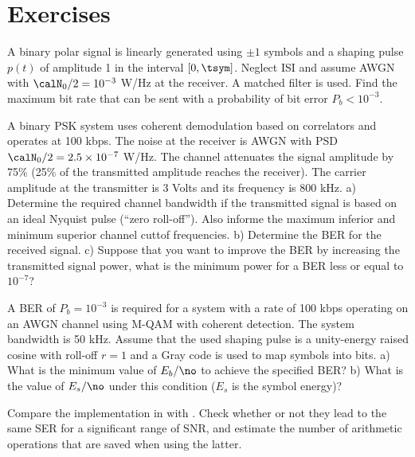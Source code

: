 \section{Exercises}

\begin{exercises}

\item A binary polar signal is linearly generated using $\pm 1$ symbols and a shaping pulse $p(t)$ of amplitude 1 in the interval $[0, \tsym]$. Neglect ISI and assume AWGN with $\calN_0 / 2 = 10^{-3}$ W/Hz at the receiver.  A matched filter is used. Find the maximum bit rate that can be sent with a probability of bit error $P_b < 10^{-3}$.

\item A binary PSK system uses coherent demodulation based on correlators and operates at 100 kbps. The noise at the receiver is AWGN with PSD $\calN_0 / 2=2.5 \times 10^{-7}$ W/Hz. The channel attenuates the signal amplitude by 75\% (25\% of the transmitted amplitude reaches the receiver). 
The carrier amplitude at the transmitter is 3 Volts and its frequency is 800 kHz. a) Determine the required channel bandwidth if the transmitted signal is based on an ideal Nyquist pulse (``zero roll-off''). Also informe the maximum inferior and minimum superior channel cuttof frequencies. b) Determine the BER for the received signal. c) Suppose that you want to improve the BER by increasing the transmitted signal power, what is the minimum power for a BER less or equal to $10^{-7}$?

\item A BER of $P_b=10^{-3}$ is required for a system with a rate of 100 kbps operating on an AWGN channel using M-QAM with coherent detection. The system bandwidth is 50 kHz. Assume that the used shaping pulse is a unity-energy raised cosine with roll-off $r=1$ and a Gray code is used to map symbols into bits. a) What is the minimum value of $E_b / \no$ to achieve the specified BER? b) What is the value of $E_s / \no$ under this condition ($E_s$ is the symbol energy)?

\item Compare the implementation in  with . Check whether or not they lead to the same SER for a significant range of SNR, and estimate the number of arithmetic operations that are saved when using the latter.



\end{exercises}
